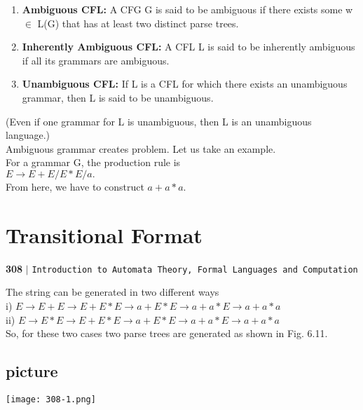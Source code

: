 \documentclass[9pt]{beamer}
\begin{document}
\begin{frame}
\begin{enumerate}
  \item \textbf{Ambiguous CFL:} A CFG G is said to be ambiguous if there exists some w $\in$ L(G) that has at
least two distinct parse trees.\\
  \item \textbf{Inherently Ambiguous CFL:} A CFL L is said to be inherently ambiguous if all its grammars are
ambiguous.\\
  \item \textbf{Unambiguous CFL:} If L is a CFL for which there exists an unambiguous grammar, then L is said
to be unambiguous.\\
\end{enumerate}

\vspace*{0.3cm}
(Even if one grammar for L is unambiguous, then L is an unambiguous language.)\\
Ambiguous grammar creates problem. Let us take an example.\\
For a grammar G, the production rule is\\

\hspace*{4cm} $E \rightarrow E + E/E*E/a.$ \\

From here, we have to construct $a + a*a$.\\
\end{frame}

\begin{frame}
\section*{Transitional Format}
\begin{flushleft}
    \textbf{308}\hspace*{0.1cm} \textbf{$|$} \hspace*{0.1cm} \texttt{Introduction to Automata Theory, Formal Languages and Computation}
  \end{flushleft}

  \vspace*{0.5cm}
The string can be generated in two different ways\\

 i)  $E \rightarrow E + E \rightarrow E + E*E \rightarrow a + E*E \rightarrow a + a*E \rightarrow a + a*a$ \\
 ii) $E \rightarrow E*E \rightarrow E + E*E \rightarrow a + E*E \rightarrow a + a*E \rightarrow a + a*a$ \\
 
 So, for these two cases two parse trees are generated as shown in Fig. 6.11.\\
 
 \begin{center}
\section{picture}
\texttt{[image: 308-1.png]}
\end{center}
\end{frame}
\end{document}
